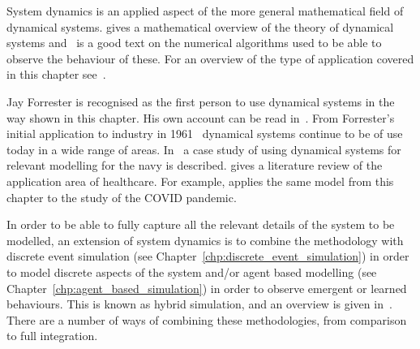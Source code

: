 System dynamics is an applied aspect of the more general mathematical field of
dynamical systems. \parencite{robinson1998dynamical} gives a mathematical
overview of the theory of dynamical systems and~\parencite{burden2001numerical}
is a good text on the numerical algorithms used to be able to observe the
behaviour of these. For an overview of the type of
application covered in this chapter see~\parencite{martin2006theory}.

Jay Forrester is recognised as the first person to use dynamical systems in the way
shown in this chapter. His own account can be read
in~\parencite{forrester1995beginning}. From Forrester's initial application to
industry in 1961~\parencite{forrester1961industrial} dynamical systems continue
to be of use today in a wide range of areas. In~\parencite{coyle1999system}
a case study of using dynamical systems for relevant modelling for the navy is
described.
\parencite{vazquez2020system} gives a literature review of the application area
of healthcare. For example, \parencite{cooper2020sir} applies the same model
from this chapter to the study of the COVID pandemic.

In order to be able to fully capture all the relevant details of the system to be
modelled, an extension of system dynamics is to combine the methodology
with discrete event simulation (see Chapter~\ref{chp:discrete_event_simulation})
in order to model discrete aspects of the system
and/or agent based modelling (see Chapter~\ref{chp:agent_based_simulation}) in
order to observe emergent or learned
behaviours. This is known as hybrid simulation, and an overview is given
in~\parencite{brailsford2019hybrid}. There are a number of ways of
combining these methodologies, from comparison to full integration.

